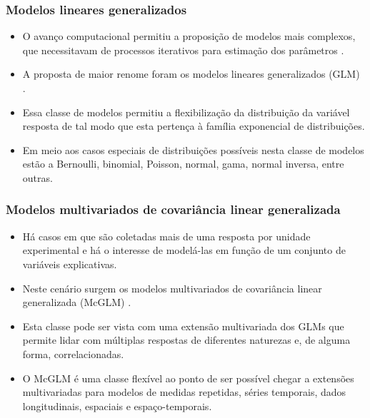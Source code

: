 \documentclass[handout,serif, professionalfont, usenames, dvipsnames, aspectratio = 169]{beamer}\usepackage[]{graphicx}\usepackage[]{color}
\begin{document}

\begin{frame}
  \frametitle{Modelos lineares generalizados}

  \begin{itemize}
    \itemsep 2ex

  \item O avanço computacional permitiu a proposição de modelos mais complexos, que necessitavam de processos iterativos para estimação dos parâmetros \cite{paula}. 
  
  \item A proposta de maior renome foram os modelos lineares generalizados (GLM) \cite{Nelder72}. 
  
  \item Essa classe de modelos permitiu a flexibilização da distribuição da variável resposta de tal modo que esta pertença à família exponencial de distribuições. 

  \item Em meio aos casos especiais de distribuições possíveis nesta classe de modelos estão a Bernoulli, binomial, Poisson, normal, gama, normal inversa, entre outras.  
  
  \end{itemize}
\end{frame}


\begin{frame}
  \frametitle{Modelos multivariados de covariância linear generalizada}

  \begin{itemize}
    \itemsep 2ex

  \item Há casos em que são coletadas mais de uma resposta por unidade experimental e há o interesse de modelá-las em função de um conjunto de variáveis explicativas. 
  
  \item Neste cenário surgem os modelos multivariados de covariância linear generalizada (McGLM) \cite{Bonat16}. 
  
  \item Esta classe pode ser vista com uma extensão multivariada dos GLMs que permite lidar com múltiplas respostas de diferentes naturezas e, de alguma forma, correlacionadas. 

  \item O McGLM é uma classe flexível ao ponto de ser possível chegar a extensões multivariadas para modelos de medidas repetidas, séries temporais, dados longitudinais, espaciais e espaço-temporais.
  
  \end{itemize}
\end{frame}
\end{document}

